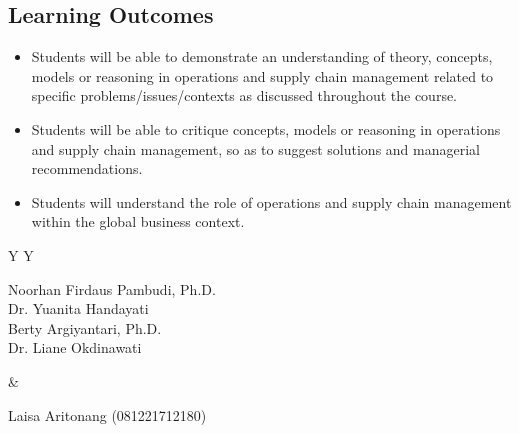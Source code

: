 \documentclass[10pt]{article}
\begin{document}
\subsection{Learning Outcomes}
\begin{itemize}
\item Students will be able to demonstrate an understanding of theory, concepts, models or reasoning in operations and supply chain management related to specific problems/issues/contexts as discussed throughout the course.
\item Students will be able to critique concepts, models or reasoning in operations and supply chain management, so as to suggest solutions and managerial recommendations.
\item Students will understand the role of operations and supply chain management within the global business context.
\end{itemize}

\begin{tabularx}{\textwidth}{Y Y}
\begin{tcolorbox}[colback=white,colframe=navy,title=Tim Pengajar - Dosen Pengampu,fonttitle=\bfseries]
Noorhan Firdaus Pambudi, Ph.D.\\Dr. Yuanita Handayati\\Berty Argiyantari, Ph.D.\\Dr. Liane Okdinawati
\end{tcolorbox}&
\begin{tcolorbox}[colback=white,colframe=midblue,title=Asisten Mata Kuliah,fonttitle=\bfseries]
Laisa Aritonang (081221712180)
\end{tcolorbox}
\end{tabularx}
\end{document}
